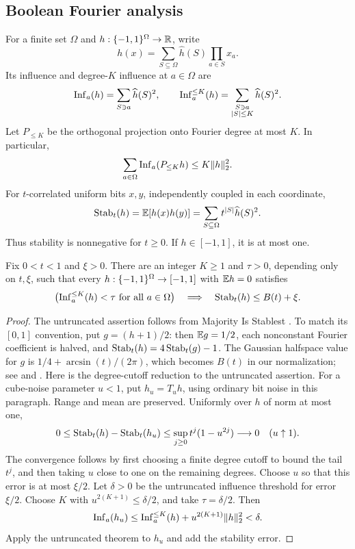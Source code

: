 \subsection{Boolean Fourier analysis}

For a finite set $\Omega$ and $h:\{-1,1\}^\Omega\to\mathbb R$, write
\[
 h(x)=\sum_{S\subseteq\Omega}\widehat h(S)\prod_{a\in S}x_a.
\]
Its influence and degree-$K$ influence at $a\in\Omega$ are
\[
 \operatorname{Inf}_a(h)=\sum_{S\ni a}\widehat h(S)^2,\qquad
 \operatorname{Inf}_a^{\le K}(h)=\sum_{\substack{S\ni a\\|S|\le K}}
 \widehat h(S)^2.
\]
Let $P_{\le K}$ be the orthogonal projection onto Fourier degree at most
$K$. In particular,
\begin{equation}\label{eq:degree-influence}
 \sum_{a\in\Omega}\operatorname{Inf}_a(P_{\le K}h)
 \le K\lVert h\rVert_2^2.
\end{equation}
For $t$-correlated uniform bits $x,y$, independently coupled in each
coordinate,
\begin{equation}\label{eq:stability}
 \operatorname{Stab}_t(h)=\mathbb E[h(x)h(y)]
 =\sum_{S\subseteq\Omega}t^{|S|}\widehat h(S)^2.
\end{equation}
Thus stability is nonnegative for $t\ge0$. If $h\in[-1,1]$, it is at most
one.

\begin{lemma}\label{lem:mis}
Fix $0<t<1$ and $\xi>0$. There are an integer $K\ge1$ and $\tau>0$,
depending only on $t,\xi$, such that every
$h:\{-1,1\}^\Omega\to[-1,1]$ with $\mathbb E h=0$ satisfies
\[
 \bigl(\operatorname{Inf}_a^{\le K}(h)<\tau\text{ for all }a\in\Omega\bigr)
 \quad\Longrightarrow\quad
 \operatorname{Stab}_t(h)\le B(t)+\xi.
\]
\end{lemma}

\begin{proof}
The untruncated assertion follows from Majority Is Stablest
\cite[Theorem~4.4]{MOO10}. To match its $[0,1]$ convention, put
$g=(h+1)/2$: then $\mathbb E g=1/2$, each nonconstant Fourier coefficient is
halved, and $\operatorname{Stab}_t(h)=4\operatorname{Stab}_t(g)-1$. The Gaussian halfspace value
for $g$ is $1/4+\arcsin(t)/(2\pi)$, which becomes $B(t)$ in our
normalization; see \cite[Theorem~4.1 and Corollary~4.3]{MOO10} and
\cite{Borell85}. Here is the degree-cutoff reduction to the untruncated
assertion. For a cube-noise
parameter $u<1$, put $h_u=T_u h$, using ordinary bit noise in this
paragraph. Range and mean are preserved. Uniformly over $h$ of norm at
most one,
\[
 0\le\operatorname{Stab}_t(h)-\operatorname{Stab}_t(h_u)
 \le\sup_{j\ge0}t^j(1-u^{2j})\longrightarrow0
 \quad(u\uparrow1).
\]
The convergence follows by first choosing a finite degree cutoff to bound
the tail $t^j$, and then taking $u$ close to one on the remaining degrees.
Choose $u$ so that this error is at most $\xi/2$. Let $\delta>0$ be the
untruncated influence threshold for error $\xi/2$. Choose $K$ with
$u^{2(K+1)}\le\delta/2$, and take $\tau=\delta/2$. Then
\[
 \operatorname{Inf}_a(h_u)
 \le\operatorname{Inf}_a^{\le K}(h)+u^{2(K+1)}\lVert h\rVert_2^2
 <\delta.
\]
Apply the untruncated theorem to $h_u$ and add the stability error.
\end{proof}

